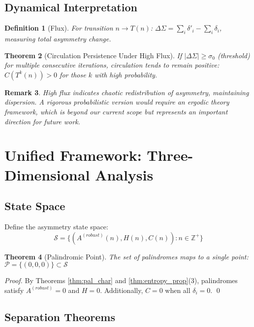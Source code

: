 \documentclass[12pt,a4paper]{article}
\newtheorem{theorem}{Theorem}[section]
\newtheorem{definition}[theorem]{Definition}
\newtheorem{remark}[theorem]{Remark}
\begin{document}
\subsection{Dynamical Interpretation}

\begin{definition}[Flux]
For transition $n \to T(n)$: $\Delta\Sigma = \sum_i \delta'_i - \sum_i \delta_i$, measuring total asymmetry change.
\end{definition}

\begin{theorem}[Circulation Persistence Under High Flux]\label{thm:circ_persist}
If $|\Delta\Sigma| \geq \sigma_0$ (threshold) for multiple consecutive iterations, circulation tends to remain positive: $C(T^k(n)) > 0$ for those $k$ with high probability.
\end{theorem}

\begin{remark}
High flux indicates chaotic redistribution of asymmetry, maintaining dispersion. A rigorous probabilistic version would require an ergodic theory framework, which is beyond our current scope but represents an important direction for future work.
\end{remark}

\section{Unified Framework: Three-Dimensional Analysis}

\subsection{State Space}

Define the asymmetry state space:
$$\mathcal{S} = \{(A^{(robust)}(n), H(n), C(n)) : n \in \mathbb{Z}^+\}$$

\begin{theorem}[Palindromic Point]\label{thm:pal_point}
The set of palindromes maps to a single point: $\mathcal{P} = \{(0, 0, 0)\} \subset \mathcal{S}$
\end{theorem}

\begin{proof}
By Theorems \ref{thm:pal_char} and \ref{thm:entropy_prop}(3), palindromes satisfy $A^{(robust)} = 0$ and $H = 0$. Additionally, $C = 0$ when all $\delta_i = 0$. \qed
\end{proof}

\subsection{Separation Theorems}
\end{document}
